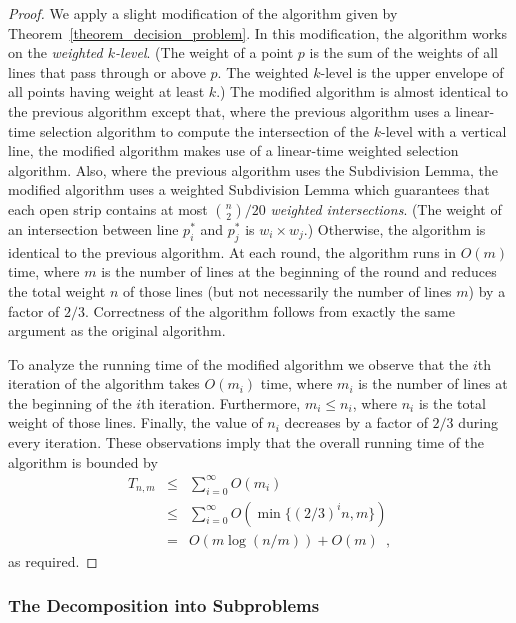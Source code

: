 \documentclass[charterfonts,lotsofwhite]{patmorin}
\begin{document}
\begin{proof} We apply a slight modification of the algorithm given by
Theorem~\ref{theorem_decision_problem}.  In this modification, the
algorithm works on the \emph{weighted $k$-level}.  (The weight of a
point $p$ is the sum of the weights of all lines that pass through or
above $p$. The weighted $k$-level is the upper envelope of all points
having weight at least $k$.)  The modified algorithm is almost
identical to the previous algorithm except that, where the previous
algorithm uses a linear-time selection algorithm to compute the
intersection of the $k$-level with a vertical line, the modified
algorithm makes use of a linear-time weighted selection algorithm.
Also, where the previous algorithm uses the Subdivision Lemma, the
modified algorithm uses a weighted Subdivision Lemma which guarantees
that each open strip contains at most ${n\choose 2}/20$ \emph{weighted
intersections}.  (The weight of an intersection between line $p_i^*$
and $p_j^*$ is $w_i\times w_j$.) Otherwise, the algorithm is identical
to the previous algorithm.  At each round, the algorithm runs in
$O(m)$ time, where $m$ is the number of lines at the beginning of the
round and reduces the total weight $n$ of those lines (but not
necessarily the number of lines $m$) by a factor of $2/3$.
Correctness of the algorithm follows from exactly the same argument as
the original algorithm.

To analyze the running time of the modified algorithm we observe that the
$i$th iteration of the algorithm takes $O(m_i)$ time, where $m_i$ is
the number of lines at the beginning of the $i$th iteration.
Furthermore, $m_i\le n_i$, where $n_i$ is the total weight of those
lines. Finally, the value of $n_i$ decreases by a factor of $2/3$
during every iteration. These observations imply that the overall
running time of the algorithm is bounded by 
\begin{eqnarray*} 
  T_{n,m}
    & \le & \sum_{i=0}^{\infty} O(m_i) \\ 
    &\le& \sum_{i=0}^{\infty} O(\min\{(2/3)^in, m\})  \\ 
    & = & O(m\log (n/m)) + O(m) \enspace ,
\end{eqnarray*} 
as required.  
\end{proof}

\subsubsection{The Decomposition into
Subproblems}\label{section_decomp}
\end{document}
